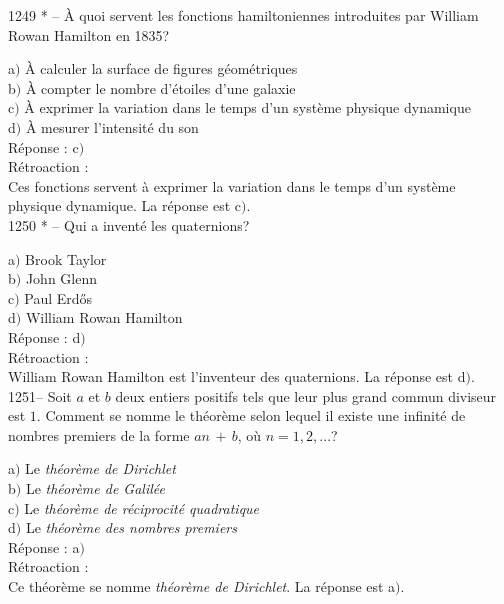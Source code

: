 ﻿\documentclass[letterpaper, 12pt]{article}
\begin{document}
1249 * -- \`A quoi servent les fonctions hamiltoniennes introduites
par William Rowan Hamilton en 1835?

a$)$ \`A calculer la surface de figures g\'eom\'etriques \\
b$)$ \`A compter le nombre d'\'etoiles d'une galaxie \\
c$)$ \`A exprimer la variation dans le temps d'un syst\`eme physique
dynamique \\
d$)$ \`A mesurer l'intensit\'e du son \\

R\'eponse : c$)$\\

R\'etroaction : \\
Ces fonctions servent \`a exprimer la variation dans le temps d'un
syst\`eme physique dynamique.
La r\'eponse est c$)$.\\

1250 * -- Qui a invent\'e les quaternions?

a$)$ Brook Taylor \\
b$)$ John Glenn \\
c$)$ Paul Erd\H{o}s \\
d$)$ William Rowan Hamilton\\

R\'eponse : d$)$\\

R\'etroaction : \\
William Rowan Hamilton est l'inventeur des quaternions.
La r\'eponse est d$)$.\\

1251-- Soit $a$ et $b$ deux entiers positifs tels que leur plus
grand commun diviseur est $1$. Comment se nomme le th\'eor\`eme
selon lequel il existe une infinit\'e de nombres premiers de la
forme $an\,+\,b$, o\`u $n=1,2,\ldots$?

a$)$ Le {\sl th\'eor\`eme de Dirichlet} \\
b$)$ Le {\sl th\'eor\`eme de Galil\'ee} \\
c$)$ Le {\sl th\'eor\`eme de r\'eciprocit\'e quadratique} \\
d$)$ Le {\sl th\'eor\`eme des nombres premiers}\\

R\'eponse : a$)$\\

R\'etroaction : \\
Ce th\'eor\`eme se nomme {\sl th\'eor\`eme de Dirichlet}.
La r\'eponse est a$)$.\\
\end{document}
